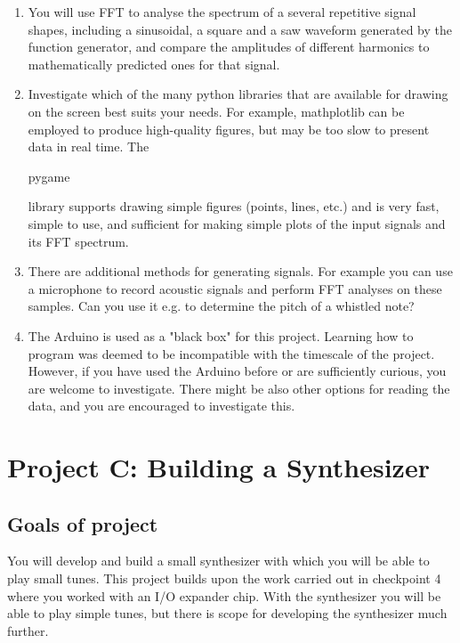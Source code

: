 \begin{enumerate}

\item	You will use FFT to analyse the spectrum of a several repetitive signal shapes, including a sinusoidal, a square and a saw waveform generated by the function generator, and compare the amplitudes of different harmonics to mathematically predicted ones for that signal.

\item Investigate which of the many python libraries that are available for drawing on the screen best suits your needs. For example, mathplotlib can be employed to produce high-quality figures, but may be too slow to present data in real time. The \begin{tt}pygame\end{tt} library supports drawing simple figures (points, lines, etc.) and is very fast, simple to use, and sufficient for making simple plots of the input signals and its FFT spectrum.

\item There are additional methods for generating signals. For example you can use a microphone to record acoustic signals and perform FFT analyses on these samples. Can you use it e.g. to determine the pitch of a whistled note?

\item The Arduino is used as a "black box" for this project. Learning how to program was deemed to be incompatible with the timescale of the project. However, if you have used the Arduino before or are sufficiently curious, you are welcome to investigate. There might be also other options for reading the data, and you are encouraged to investigate this.

\end{enumerate}



\newpage
\section{Project C: Building a Synthesizer}

\subsection{Goals of project}

You will develop and build a small synthesizer with which you will be able to play small tunes. This project builds upon the work carried out in checkpoint 4 where you worked with an I/O expander chip. With the synthesizer you will be able to play simple tunes, but there is scope for developing the synthesizer much further.

